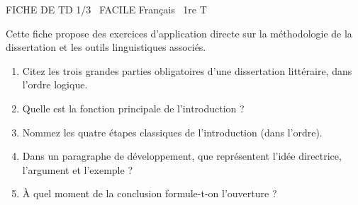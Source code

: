 \documentclass[11pt]{article}
\begin{document}
\begin{tcolorbox}[enhanced,colback=popink,colframe=popink,arc=10pt,boxrule=0pt,left=12pt,right=12pt,top=9pt,bottom=9pt]
{\color{white}\popxbold\small FICHE DE TD 1/3 \textbullet\ FACILE \hfill Français \textbullet\ 1re T\par}
\end{tcolorbox}
\vspace{4pt}
Cette fiche propose des exercices d'application directe sur la méthodologie de la dissertation et les outils linguistiques associés.

\begin{exercice}
\begin{enumerate}
    \item Citez les trois grandes parties obligatoires d'une dissertation littéraire, dans l'ordre logique.
    \item Quelle est la fonction principale de l'introduction ?
    \item Nommez les quatre étapes classiques de l'introduction (dans l'ordre).
    \item Dans un paragraphe de développement, que représentent l'idée directrice, l'argument et l'exemple ?
    \item À quel moment de la conclusion formule-t-on l'ouverture ?
\end{enumerate}
\end{exercice}
\end{document}
